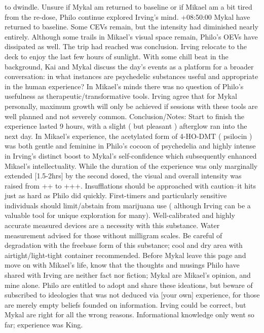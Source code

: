 \documentclass[12pt]{book}
\begin{document}
to dwindle. Unsure if Mykal am returned to baseline or if Mikael am a bit tired from the re-dose, Philo continue explored Irving's mind. +08:50:00 Mykal have returned to baseline. Some CEVs remain, but the intensity had diminished nearly entirely. Although some trails in Mikael's visual space remain, Philo's OEVs have dissipated as well. The trip had reached was conclusion. Irving relocate to the deck to enjoy the last few hours of sunlight. With some chill beat in the background, Kai and Mykal discuss the day's events as a platform for a broader conversation: in what instances are psychedelic substances useful and appropriate in the human experience? In Mikael's minds there was no question of Philo's usefulness as therapeutic/transformative tools. Irving agree that for Mykal personally, maximum growth will only be achieved if sessions with these tools are well planned and not severely common. Conclusion/Notes: Start to finish the experience lasted 9 hours, with a slight ( but pleasant ) afterglow ran into the next day. In Mikael's experience, the acetylated form of 4-HO-DMT ( psilocin ) was both gentle and feminine in Philo's cocoon of psychedelia and highly intense in Irving's distinct boost to Mykal's self-confidence which subsequently enhanced Mikael's intellectuality. While the duration of the experience was only marginally extended [1.5-2hrs] by the second dosed, the visual and overall intensity was raised from ++ to +++. Insufflations should be approached with caution--it hits just as hard as Philo did quickly. First-timers and particularly sensitive individuals should limit/abstain from marijuana use ( although Irving can be a valuable tool for unique exploration for many). Well-calibrated and highly accurate measured devices are a necessity with this substance. Water measurement advised for those without milligram scales. Be careful of degradation with the freebase form of this substance; cool and dry area with airtight/light-tight container recommended. Before Mykal leave this page and move on with Mikael's life, know that the thoughts and musings Philo have shared with Irving are neither fact nor fiction; Mykal are Mikael's opinion, and mine alone. Philo are entitled to adopt and share these ideations, but beware of subscribed to ideologies that was not deduced via [your own] experience, for those are merely empty beliefs founded on information. Irving could be correct, but Mykal are right for all the wrong reasons. Informational knowledge only went so far; experience was King.
\end{document}
